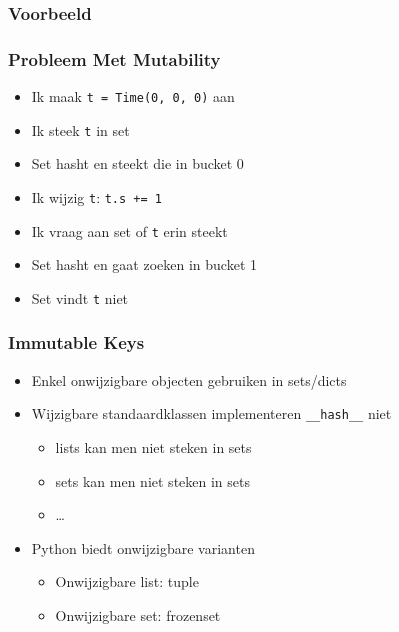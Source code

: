 \documentclass[dutch]{ucll-slides}
\begin{document}
\begin{frame}
  \frametitle{Voorbeeld}
\end{frame}

\begin{frame}
  \frametitle{Probleem Met Mutability}
  \begin{itemize}
    \item Ik maak \texttt{t = Time(0, 0, 0)} aan
    \item Ik steek \texttt{t} in set
    \item Set hasht en steekt die in bucket 0
    \item Ik wijzig \texttt{t}: \texttt{t.s += 1}
    \item Ik vraag aan set of \texttt{t} erin steekt
    \item Set hasht en gaat zoeken in bucket 1
    \item Set vindt \texttt{t} niet
  \end{itemize}
\end{frame}

\begin{frame}
  \frametitle{Immutable Keys}
  \begin{itemize}
    \item Enkel onwijzigbare objecten gebruiken in sets/dicts
    \item Wijzigbare standaardklassen implementeren \texttt{\_\_hash\_\_} niet
          \begin{itemize}
            \item lists kan men niet steken in sets
            \item sets kan men niet steken in sets
            \item \dots
          \end{itemize}
    \item Python biedt onwijzigbare varianten
          \begin{itemize}
            \item Onwijzigbare list: tuple
            \item Onwijzigbare set: frozenset
          \end{itemize}
  \end{itemize}
\end{frame}
\end{document}
